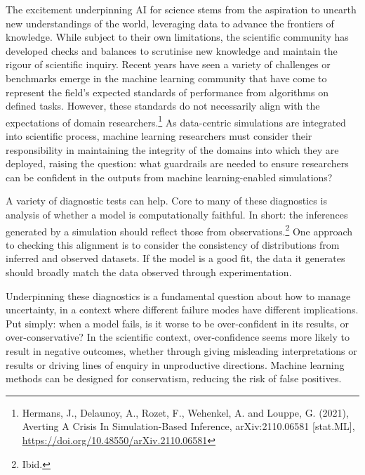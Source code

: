 {The excitement underpinning AI for science stems from the aspiration to
unearth new understandings of the world, leveraging data to advance the
frontiers of knowledge. While subject to their own limitations, the
scientific community has developed checks and balances to scrutinise new
knowledge and maintain the rigour of scientific inquiry. Recent years
have seen a variety of challenges or benchmarks emerge in the machine
learning community that have come to represent the field's expected
standards of performance from algorithms on defined tasks. However,
these standards do not necessarily align with the expectations of domain
researchers.\footnote{Hermans, J., Delaunoy, A., Rozet, F., Wehenkel, A.
  and Louppe, G. (2021), Averting A Crisis In Simulation-Based
  Inference, arXiv:2110.06581 {[}stat.ML{]},
  \href{https://doi.org/10.48550/arXiv.2110.06581}{\uline{https://doi.org/10.48550/arXiv.2110.06581}}}
As data-centric simulations are integrated into scientific process,
machine learning researchers must consider their responsibility in
maintaining the integrity of the domains into which they are deployed,
raising the question: what guardrails are needed to ensure researchers
can be confident in the outputs from machine learning-enabled
simulations?

A variety of diagnostic tests can help. Core to many of these
diagnostics is analysis of whether a model is computationally faithful.
In short: the inferences generated by a simulation should reflect those
from observations.\footnote{Ibid.} One approach to checking this
alignment is to consider the consistency of distributions from inferred
and observed datasets. If the model is a good fit, the data it generates
should broadly match the data observed through experimentation.

Underpinning these diagnostics is a fundamental question about how to
manage uncertainty, in a context where different failure modes have
different implications. Put simply: when a model fails, is it worse to
be over-confident in its results, or over-conservative? In the
scientific context, over-confidence seems more likely to result in
negative outcomes, whether through giving misleading interpretations or
results or driving lines of enquiry in unproductive directions. Machine
learning methods can be designed for conservatism, reducing the risk of
false positives.

}
